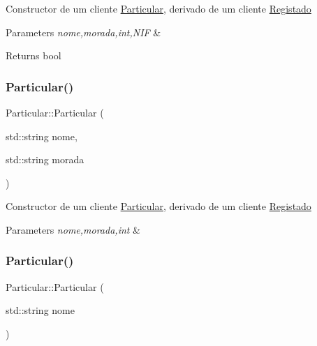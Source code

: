 Constructor de um cliente \hyperlink{class_particular}{Particular}, derivado de um cliente \hyperlink{class_registado}{Registado}


\begin{DoxyParams}{Parameters}
{\em nome,morada,int,N\+IF} & \\
\hline
\end{DoxyParams}
\begin{DoxyReturn}{Returns}
bool 
\end{DoxyReturn}
\hypertarget{class_particular_a794314799e022e8f05fda84af1722bc8}{}\label{class_particular_a794314799e022e8f05fda84af1722bc8} 
\subsubsection{\texorpdfstring{Particular()}{Particular()}\hspace{0.1cm}{\footnotesize\ttfamily [2/3]}}
{\footnotesize\ttfamily Particular\+::\+Particular (\begin{DoxyParamCaption}\item[{std\+::string}]{nome,  }\item[{std\+::string}]{morada }\end{DoxyParamCaption})}

Constructor de um cliente \hyperlink{class_particular}{Particular}, derivado de um cliente \hyperlink{class_registado}{Registado}


\begin{DoxyParams}{Parameters}
{\em nome,morada,int} & \\
\hline
\end{DoxyParams}
\hypertarget{class_particular_a55ebdb7b32d55be44f903be5a4f4d6aa}{}\label{class_particular_a55ebdb7b32d55be44f903be5a4f4d6aa} 
\subsubsection{\texorpdfstring{Particular()}{Particular()}\hspace{0.1cm}{\footnotesize\ttfamily [3/3]}}
{\footnotesize\ttfamily Particular\+::\+Particular (\begin{DoxyParamCaption}\item[{std\+::string}]{nome }\end{DoxyParamCaption})}


